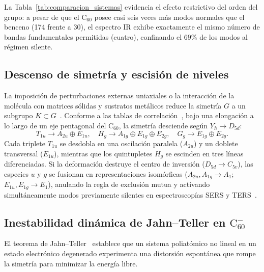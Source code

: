 La Tabla~\ref{tab:comparacion_sistemas} evidencia el efecto restrictivo del orden del grupo: a pesar de que el $\text{C}_{60}$ posee casi seis veces más modos normales que el benceno (174 frente a 30), el espectro IR exhibe exactamente el mismo número de bandas fundamentales permitidas (cuatro), confinando el $69\%$ de los modos al régimen silente.

\subsection{Descenso de simetría y escisión de niveles}
La imposición de perturbaciones externas uniaxiales o la interacción de la molécula con matrices sólidas y sustratos metálicos reduce la simetría $G$ a un subgrupo $K \subset G$~\cite{Kuzmany1994, Qin2025}. Conforme a las tablas de correlación~\cite{Dresselhaus2008, Wilson1955}, bajo una elongación a lo largo de un eje pentagonal del $\text{C}_{60}$, la simetría desciende según $Y_h \to D_{5d}$:
\begin{equation}
T_{1u} \to A_{2u} \oplus E_{1u}, \quad H_g \to A_{1g} \oplus E_{1g} \oplus E_{2g}, \quad G_g \to E_{1g} \oplus E_{2g}.
\end{equation}
Cada triplete $T_{1u}$ se desdobla en una oscilación paralela ($A_{2u}$) y un doblete transversal ($E_{1u}$), mientras que los quintupletes $H_g$ se escinden en tres líneas diferenciadas. Si la deformación destruye el centro de inversión ($D_{5d} \to C_{5v}$), las especies $u$ y $g$ se fusionan en representaciones isomórficas ($A_{2u}, A_{1g} \to A_1$; $E_{1u}, E_{1g} \to E_1$), anulando la regla de exclusión mutua y activando simultáneamente modos previamente silentes en espectroscopías SERS y TERS~\cite{Qin2025}.

\subsection{Inestabilidad dinámica de Jahn--Teller en $\text{C}_{60}^-$}
El teorema de Jahn--Teller~\cite{JahnTeller1937} establece que un sistema poliatómico no lineal en un estado electrónico degenerado experimenta una distorsión espontánea que rompe la simetría para minimizar la energía libre.

